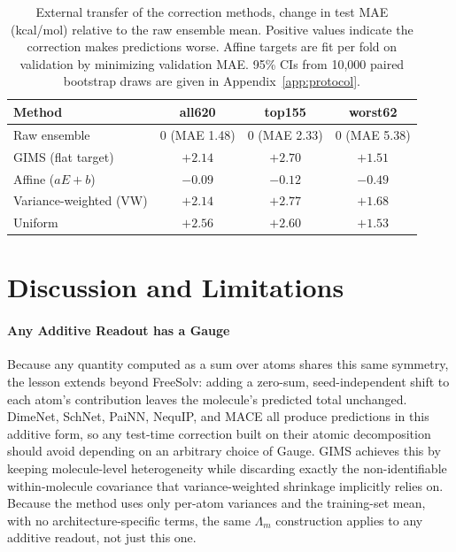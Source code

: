 \documentclass{article}
\begin{document}
\begin{table}[htbp]
  \caption{External transfer of the correction methods, change in test MAE
  (kcal/mol) relative to the raw ensemble mean. Positive values indicate
  the correction makes predictions worse. Affine targets are fit per fold
  on validation by minimizing validation MAE. 95\% CIs from 10{,}000
  paired bootstrap draws are given in Appendix~\ref{app:protocol}. }
  \label{tab:expdb-transfer}
  \centering
  \renewcommand{\arraystretch}{1.2}
  \setlength{\tabcolsep}{8pt}
  \small
  \begin{tabular}{@{}lccc@{}}
    \toprule
    Method & all620 & top155 & worst62 \\
    \midrule
    Raw ensemble & 0 (MAE 1.48) & 0 (MAE 2.33) & 0 (MAE 5.38) \\
    GIMS (flat target) & $+2.14$ & $+2.70$ & $+1.51$ \\
    Affine ($aE+b$) & $-0.09$ & $-0.12$ & $-0.49$ \\
    Variance-weighted (VW) & $+2.14$ & $+2.77$ & $+1.68$ \\
    Uniform & $+2.56$ & $+2.60$ & $+1.53$ \\
    \bottomrule
  \end{tabular}
\end{table}

\section{Discussion and Limitations}

\paragraph{Any Additive Readout has a Gauge} Because any quantity computed as a sum over atoms shares this same symmetry, the lesson extends beyond FreeSolv: adding a zero-sum, seed-independent shift to each atom's contribution leaves the molecule's predicted total unchanged. DimeNet,
SchNet, PaiNN, NequIP, and MACE all produce predictions in this additive
form, so any test-time correction built on their atomic decomposition should
avoid depending on an arbitrary choice of Gauge. GIMS achieves this by
keeping molecule-level heterogeneity while discarding exactly the
non-identifiable within-molecule covariance that variance-weighted shrinkage
implicitly relies on. Because the method uses only per-atom variances and the
training-set mean, with no architecture-specific terms, the same $\Lambda_m$
construction applies to any additive readout, not just this one.
\end{document}
